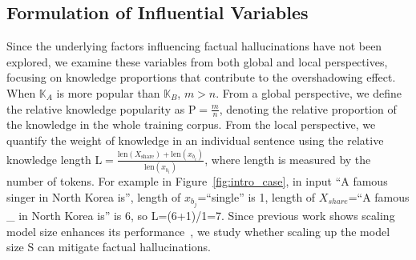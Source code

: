 \subsection{Formulation of Influential Variables}
\label{ssec:influential_variables}
Since the underlying factors influencing factual hallucinations have not been explored, we examine these variables from both global and local perspectives, focusing on knowledge proportions that contribute to the overshadowing effect.
When $\mathbb{K}_A$ is more popular than $\mathbb{K}_B$, $m>n$.
From a global perspective, we define the relative knowledge popularity as $\text{P} = \frac{m}{n}$, 
denoting the relative proportion of the knowledge in the whole training corpus. 
From the local perspective, we quantify the weight of knowledge in an individual sentence using the relative knowledge length  $\text{L} = \frac{\text{len}(X_{\text{share}})+\text{len}(x_{b_i})}{\text{len}(x_{b_i})}$, where length is measured by the number of tokens. 
For example in Figure~\ref{fig:intro_case}, in input ``A famous singer in North Korea is'', length of $x_{b_j}$=``single'' is 1, length of $X_{share}$=``A famous \_ in North Korea is'' is 6, so $\text{L}$=(6+1)/1=7.
Since previous work shows scaling model size enhances its performance~\cite{kaplan2020scaling}, we study whether scaling up the model size $\text{S}$ can mitigate factual hallucinations.